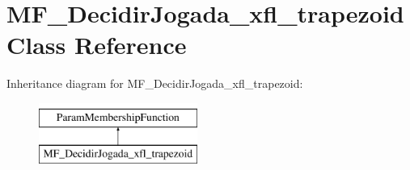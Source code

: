 \hypertarget{classMF__DecidirJogada__xfl__trapezoid}{
\section{MF\_\-DecidirJogada\_\-xfl\_\-trapezoid Class Reference}
\label{classMF__DecidirJogada__xfl__trapezoid}
}
Inheritance diagram for MF\_\-DecidirJogada\_\-xfl\_\-trapezoid:\begin{figure}[H]
\begin{center}
\leavevmode
\includegraphics[height=2.000000cm]{classMF__DecidirJogada__xfl__trapezoid}
\end{center}
\end{figure}
